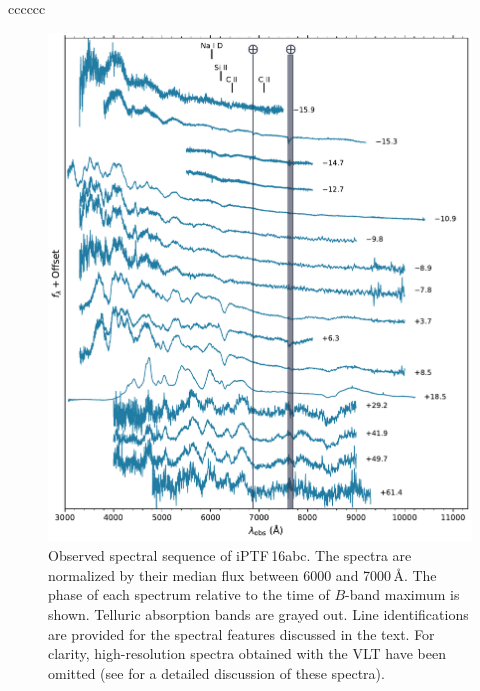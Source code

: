 \documentclass[twocolumn]{aastex61}
\newcommand{\abc}{iPTF\,16abc}
\begin{document}
\begin{deluxetable}{cccccc}
  \enddata
\end{deluxetable}

\begin{figure}[!htb]
  \centering
  \includegraphics[width=5.5in]{spectra.pdf}
  \caption{
  Observed spectral sequence of \abc. The spectra are normalized by their
  median flux between 6000 and 7000$\,\textrm{\AA}$. The phase of each
  spectrum relative to the time of $B$-band maximum is shown.
  Telluric absorption bands are grayed out. Line identifications are provided
  for the spectral features discussed in the text. For clarity,
  high-resolution spectra obtained with the VLT have been omitted (see
  \citealt{2017A&A...606A.111F} for a detailed discussion of these spectra).}
  \label{fig:spec_seq}
\end{figure}
\end{document}
